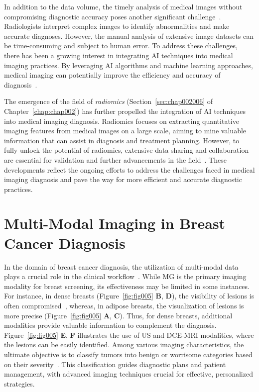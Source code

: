 In addition to the data volume, the timely analysis of medical images without compromising diagnostic accuracy poses another significant challenge~\cite{10.1145/3399715.3399744, 10.1145/3132272.3134111}.
Radiologists interpret complex images to identify abnormalities and make accurate diagnoses.
However, the manual analysis of extensive image datasets can be time-consuming and subject to human error.
To address these challenges, there has been a growing interest in integrating \ac{AI} techniques into medical imaging practices.
By leveraging AI algorithms and machine learning approaches, medical imaging can potentially improve the efficiency and accuracy of diagnosis~\cite{Lambin2017, pesapane2018artificial, doi:10.1148/radiol.2015151169}.

The emergence of the field of {\it radiomics} (Section~\ref{sec:chap002006} of Chapter~\ref{chap:chap002}) has further propelled the integration of \ac{AI} techniques into medical imaging diagnosis.
Radiomics focuses on extracting quantitative imaging features from medical images on a large scale, aiming to mine valuable information that can assist in diagnosis and treatment planning.
However, to fully unlock the potential of radiomics, extensive data sharing and collaboration are essential for validation and further advancements in the field~\cite{Lambin2017, pesapane2018artificial, doi:10.1148/radiol.2015151169}.
These developments reflect the ongoing efforts to address the challenges faced in medical imaging diagnosis and pave the way for more efficient and accurate diagnostic practices.

\section{Multi-Modal Imaging in Breast Cancer Diagnosis}
\label{sec:app001002}

In the domain of breast cancer diagnosis, the utilization of multi-modal data plays a crucial role in the clinical workflow~\cite{10.1117/1.JBO.22.4.046008}.
While \ac{MG} is the primary imaging modality for breast screening, its effectiveness may be limited in some instances.
For instance, in dense breasts (Figure~\ref{fig:fig005} {\bf B}, {\bf D}), the visibility of lesions is often compromised~\cite{10.1093/jbi/wbaa010}, whereas, in adipose breasts, the visualization of lesions is more precise (Figure~\ref{fig:fig005} {\bf A}, {\bf C}).
Thus, for dense breasts, additional modalities provide valuable information to complement the diagnosis.
Figure~\ref{fig:fig005} {\bf E}, {\bf F} illustrates the use of \ac{US} and \ac{DCE-MRI} modalities, where the lesions can be easily identified.
Among various imaging characteristics, the ultimate objective is to classify tumors into benign or worrisome categories based on their severity~\cite{SHAN2016980}.
This classification guides diagnostic plans and patient management, with advanced imaging techniques crucial for effective, personalized strategies.

